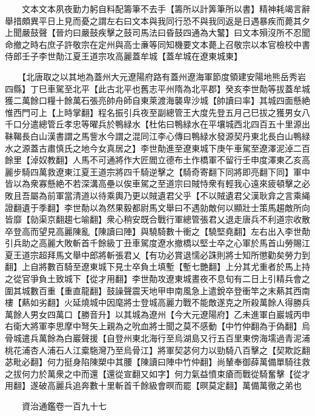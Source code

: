 　　文本文本夙夜勤力躬自料配籌筆不去手【籌所以計筭筆所以書】精神耗竭言辭舉措頗異平日上見而憂之謂左右曰文本與我同行恐不與我同返是日遇暴疾而薨其夕上聞嚴鼓聲【晉灼曰嚴鼓疾擊之鼓司馬法曰昏鼓四通為大鼜】曰文本殞沒所不忍聞命撤之時右庶子許敬宗在定州與高士亷等同知機要文本薨上召敬宗以本官檢校中書侍郎壬子李世勣江夏王道宗攻高麗蓋牟城【蓋牟城在遼東城東】

　　【北唐取之以其地為蓋州大元遼陽府路有蓋州遼海軍節度領建安陽地熊岳秀岩四縣】丁巳車駕至北平【此古北平也舊志平州隋為北平郡】癸亥李世勣等拔蓋牟城獲二萬餘口糧十餘萬石張亮帥舟師自東萊渡海襲卑沙城【帥讀曰率】其城四面懸絶惟西門可上【上時掌翻】程名振引兵夜至副總管王大度先登五月己巳拔之獲男女八千口分遣總管丘孝忠等曜兵於鴨緑水【杜佑曰鴨緑水在平壤城西北四百五十里源出靺鞨長白山漢書謂之馬訾水今謂之混同江李心傳曰鴨緑水發源契丹東北長白山鴨緑水之源蓋古肅慎氏之地今女真居之】李世勣進至遼東城下庚午車駕至遼澤泥淖二百餘里【淖奴教翻】人馬不可通將作大匠閻立德布土作橋軍不留行壬申度澤東乙亥高麗步騎四萬救遼東江夏王道宗將四千騎逆擊之【騎奇寄翻下同將即亮翻下同】軍中皆以為衆寡懸絶不若深溝高壘以俟車駕之至道宗曰賊恃衆有輕我心遠來疲頓擊之必敗且吾屬為前軍當清道以待乘輿乃更以賊遺君父乎【不以賊遺君父漢耿弇之言乘䋲證翻遺于季翻】李世勣以為然果毅都尉馬文舉曰不遇勍敵何以顯壯士策馬趨敵所向皆靡【勍渠京翻趨七喻翻】衆心稍安既合戰行軍總管張君乂退走唐兵不利道宗收散卒登高而望見高麗陳亂【陳讀曰陣】與驍騎數十衝之【驍堅堯翻】左右出入李世勣引兵助之高麗大敗斬首千餘級丁丑車駕度遼水撤橋以堅士卒之心軍於馬首山勞賜江夏王道宗超拜馬文舉中郎將斬張君乂【有功必賞退懦必誅則將士知所懲勸矣勞力到翻】上自將數百騎至遼東城下見士卒負土填塹【塹七艷翻】上分其尤重者於馬上持之從官爭負土致城下【從才用翻】李世勣攻遼東城晝夜不息旬有二日上引精兵會之圍其城數百重【重直龍翻】鼓譟聲震天地甲申南風急上遣銳卒登衝竿之末爇其西南樓【爇如劣翻】火延燒城中因麾將士登城高麗力戰不能敵遂克之所殺萬餘人得勝兵萬餘人男女四萬口【勝音升】以其城為遼州【今大元遼陽府】乙未進軍白巖城丙申右衛大將軍李思摩中弩矢上親為之吮血將士聞之莫不感動【中竹仲翻為于偽翻】烏骨城遣兵萬餘為白巖聲援【自登州東北海行至烏湖島又行五百里東傍海壖過青泥浦桃花浦杏人浦石人江槖駞灣乃至烏骨江】將軍契苾何力以勁騎八百擊之【契欺訖翻苾毗必翻】何力挺身陷陳槊中其腰【陳讀曰陣中竹仲翻】尚輦奉御薛萬備單騎往救之拔何力於萬衆之中而還【還從宣翻又如字】何力氣益憤束瘡而戰從騎奮擊【從才用翻】遂破高麗兵追奔數十里斬首千餘級會暝而罷【暝莫定翻】萬備萬徹之弟也

　　資治通鑑卷一百九十七


    


 


